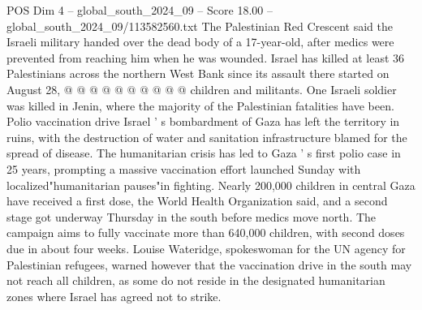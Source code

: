 \begin{textsample}{POS Dim 4 – global\_south\_2024\_09 – Score 18.00 – global\_south\_2024\_09/113582560.txt}
The Palestinian Red Crescent said the Israeli military handed over the dead body of a 17-year-old, after medics were prevented from reaching him when he was wounded.
Israel has killed at least 36 Palestinians across the northern West Bank since its assault there started on August 28, @ @ @ @ @ @ @ @ @ @ children and militants.
One Israeli soldier was killed in Jenin, where the majority of the Palestinian fatalities have been.
Polio vaccination drive Israel ' s bombardment of Gaza has left the territory in ruins, with the destruction of water and sanitation infrastructure blamed for the spread of disease.
The humanitarian crisis has led to Gaza ' s first polio case in 25 years, prompting a massive vaccination effort launched Sunday with localized"humanitarian pauses"in fighting.
Nearly 200,000 children in central Gaza have received a first dose, the World Health Organization said, and a second stage got underway Thursday in the south before medics move north.
The campaign aims to fully vaccinate more than 640,000 children, with second doses due in about four weeks.
Louise Wateridge, spokeswoman for the UN agency for Palestinian refugees, warned however that the vaccination drive in the south may not reach all children, as some do not reside in the designated humanitarian zones where Israel has agreed not to strike.

\end{textsample}
